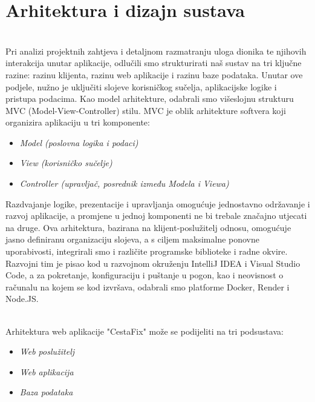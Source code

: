 \chapter{Arhitektura i dizajn sustava}

\noindent \\Pri analizi projektnih zahtjeva i detaljnom razmatranju uloga dionika te njihovih interakcija unutar aplikacije, odlučili smo strukturirati naš sustav na tri ključne razine: razinu klijenta, razinu web aplikacije i razinu baze podataka. Unutar ove podjele, nužno je uključiti slojeve korisničkog sučelja, aplikacijske logike i pristupa podacima. Kao model arhitekture, odabrali smo višeslojnu strukturu MVC (Model-View-Controller) stilu. MVC je oblik arhitekture softvera koji organizira aplikaciju u tri komponente:

\begin{itemize}
	\item 	\textit{Model (poslovna logika i podaci)}
	\item 	\textit{View (korisničko sučelje)}
	\item 	\textit{Controller (upravljač, posrednik između Modela i Viewa)}
\end{itemize}
\noindent Razdvajanje logike, prezentacije i upravljanja omogućuje jednostavno održavanje i razvoj aplikacije, a promjene u jednoj komponenti ne bi trebale značajno utjecati na druge. Ova arhitektura, bazirana na klijent-poslužitelj odnosu, omogućuje jasno definiranu organizaciju slojeva, a s ciljem maksimalne ponovne uporabivosti, integrirali smo i različite programske biblioteke i radne okvire. Razvojni tim je pisao kod u razvojnom okruženju IntelliJ IDEA i Visual Studio Code, a za pokretanje, konfiguraciju i puštanje u pogon, kao i neovisnost o računalu na kojem se kod izvršava, odabrali smo platforme Docker, Render i Node.JS.


\noindent \\Arhitektura web aplikacije "CestaFix" može se podijeliti na tri podsustava:
\begin{itemize}
	\item 	\textit{Web poslužitelj}
	\item   \textit{Web aplikacija}
	\item   \textit{Baza podataka}
\end{itemize}

